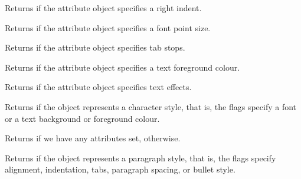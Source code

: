 \label{wxtextattrhasrightindent}


Returns \true if the attribute object specifies a right indent.

\label{wxtextattrhasfontsize}


Returns \true if the attribute object specifies a font point size.

\label{wxtextattrhastabs}


Returns \true if the attribute object specifies tab stops.

\label{wxtextattrhastextcolour}


Returns \true if the attribute object specifies a text foreground colour.

\label{wxtextattrhastexteffects}


Returns \true if the attribute object specifies text effects.

\label{wxtextattrischaracterstyle}


Returns \true if the object represents a character style, that is,
the flags specify a font or a text background or foreground colour.

\label{wxtextattrisdefault}


Returns \false if we have any attributes set, \true otherwise.

\label{wxtextattrisparagraphstyle}


Returns \true if the object represents a paragraph style, that is,
the flags specify alignment, indentation, tabs, paragraph spacing, or
bullet style.

\label{wxtextattrmerge}

